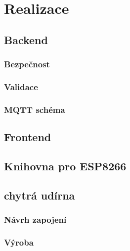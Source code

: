 \chapter{Realizace}

\section{Backend}

\subsection{Bezpečnost}

\subsection{Validace}

\subsection{MQTT schéma}

\section{Frontend}

\section{Knihovna pro ESP8266}

\section{chytrá udírna}

\subsection{Návrh zapojení}

\subsection{Výroba}